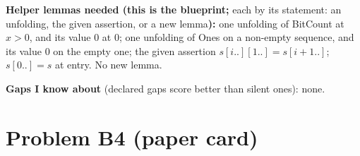 \documentclass[11pt]{article}
\begin{document}
\begin{answer}
\textbf{Helper lemmas needed (this is the blueprint;} each by its statement:
an unfolding, the given assertion, or a new lemma\textbf{):} one unfolding of
BitCount at $x > 0$, and its value $0$ at $0$; one unfolding of Ones on a
non-empty sequence, and its value $0$ on the empty one; the given assertion
$s[i..][1..] = s[i + 1..]$; $s[0..] = s$ at entry. No new lemma.

\textbf{Gaps I know about} (declared gaps score better than silent ones): none.
\end{answer}

\section*{Problem B4 (paper card)}\label{ans:B4}
\end{document}
